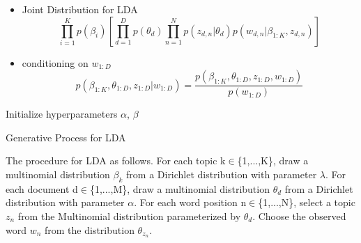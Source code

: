 \begin{itemize}
\item Joint Distribution for LDA
\begin{equation*}
\prod_{i=1}^{K}p(\beta_i)\left[\prod_{d=1}^{D}p(\theta_d)\prod_{n=1}^{N}p(z_{d,n}|\theta_d)p(w_{d,n}|\beta_{1:K},z_{d,n})\right]
\end{equation*} 
\item conditioning on $w_{1:D}$
\begin{equation*}
p(\beta_{1:K},\theta_{1:D},z_{1:D}|w_{1:D})=\frac{p(\beta_{1:K},\theta_{1:D},z_{1:D},w_{1:D})}{p(w_{1:D})}
\end{equation*}
\end{itemize}
\begin{algorithm}[H]
Initialize hyperparameters $ \alpha $, $ \beta $\\
\caption{Generative Process for LDA}
\end{algorithm}
The procedure for LDA as follows. For each topic k$\in$\{1,...,K\}, draw a multinomial distribution $\beta_k$ from a Dirichlet distribution with parameter $\lambda$. For each document d$\in$\{1,...,M\}, draw a multinomial distribution $\theta_d$ from a Dirichlet distribution with parameter $\alpha$. For each word position n$\in$\{1,...,N\}, select a topic $z_n$ from the Multinomial distribution parameterized by $\theta_d$. Choose the observed word $w_n$ from the distribution $\theta_{z_n}$.
